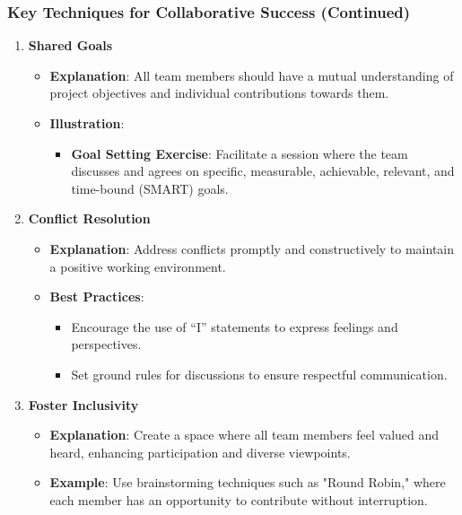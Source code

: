\documentclass{beamer}
\begin{document}
\begin{frame}[fragile]
    \frametitle{Key Techniques for Collaborative Success (Continued)}
    \begin{enumerate}[resume]
        \item \textbf{Shared Goals}
            \begin{itemize}
                \item \textbf{Explanation}: All team members should have a mutual understanding of project objectives and individual contributions towards them.
                \item \textbf{Illustration}:
                    \begin{itemize}
                        \item \textbf{Goal Setting Exercise}: Facilitate a session where the team discusses and agrees on specific, measurable, achievable, relevant, and time-bound (SMART) goals.
                    \end{itemize}
            \end{itemize}

        \item \textbf{Conflict Resolution}
            \begin{itemize}
                \item \textbf{Explanation}: Address conflicts promptly and constructively to maintain a positive working environment.
                \item \textbf{Best Practices}:
                    \begin{itemize}
                        \item Encourage the use of “I” statements to express feelings and perspectives.
                        \item Set ground rules for discussions to ensure respectful communication.
                    \end{itemize}
            \end{itemize}

        \item \textbf{Foster Inclusivity}
            \begin{itemize}
                \item \textbf{Explanation}: Create a space where all team members feel valued and heard, enhancing participation and diverse viewpoints.
                \item \textbf{Example}: Use brainstorming techniques such as "Round Robin," where each member has an opportunity to contribute without interruption.
            \end{itemize}
    \end{enumerate}
\end{frame}
\end{document}
